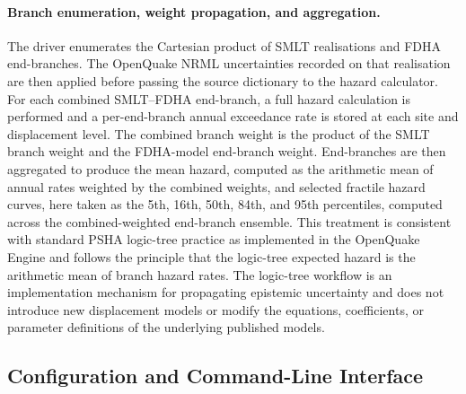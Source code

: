\paragraph{Branch enumeration, weight propagation, and aggregation.}
The driver enumerates the Cartesian product of SMLT realisations and FDHA end-branches. The OpenQuake NRML uncertainties recorded on that realisation are then applied before passing the source dictionary to the hazard calculator. For each combined SMLT--FDHA end-branch, a full hazard calculation is performed and a per-end-branch annual exceedance rate is stored at each site and displacement level. The combined branch weight is the product of the SMLT branch weight and the FDHA-model end-branch weight. End-branches are then aggregated to produce the mean hazard, computed as the arithmetic mean of annual rates weighted by the combined weights, and selected fractile hazard curves, here taken as the 5th, 16th, 50th, 84th, and 95th percentiles, computed across the combined-weighted end-branch ensemble. This treatment is consistent with standard PSHA logic-tree practice as implemented in the OpenQuake Engine \citep{Pagani2014, Bommer2008} and follows the principle that the logic-tree expected hazard is the arithmetic mean of branch hazard rates. The logic-tree workflow is an implementation mechanism for propagating epistemic uncertainty and does not introduce new displacement models or modify the equations, coefficients, or parameter definitions of the underlying published models.


\subsection{Configuration and Command-Line Interface}
\label{sec:architecture:config}


